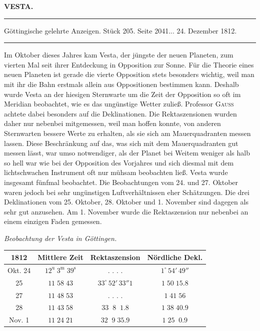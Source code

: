 \clearpage{}\hypertarget{native-366-lower}{}\label{native-366-lower}
\begin{center}\textbf{VESTA.}\par\vspace{4pt}\hrule\vspace{4pt}\fontsize{10}{12}\selectfont Göttingische gelehrte Anzeigen. Stück 205. Seite 2041\;... 24. Dezember 1812.\par\vspace{4pt}\hrule\vspace{4pt}\end{center}

\par\indent Im Oktober dieses Jahres kam Vesta, der jüngste der neuen Planeten, zum vierten Mal seit ihrer Entdeckung in Opposition zur Sonne. Für die Theorie eines neuen Planeten ist gerade die vierte Opposition stets besonders wichtig, weil man mit ihr die Bahn erstmals allein aus Oppositionen bestimmen kann. Deshalb wurde Vesta an der hiesigen Sternwarte um die Zeit der Opposition so oft im Meridian beobachtet, wie es das ungünstige Wetter zuließ. Professor \textsc{Gauss} achtete dabei besonders auf die Deklinationen. Die Rektaszensionen wurden daher nur nebenbei mitgemessen, weil man hoffen konnte, von anderen Sternwarten bessere Werte zu erhalten, als sie sich am Mauerquadranten messen lassen. Diese Beschränkung auf das, was sich mit dem Mauerquadranten gut messen lässt, war umso notwendiger, als der Planet bei Weitem weniger als halb so hell war wie bei der Opposition des Vorjahres und sich diesmal mit dem lichtschwachen Instrument oft nur mühsam beobachten ließ. Vesta wurde insgesamt fünfmal beobachtet. Die Beobachtungen vom 24. und 27. Oktober waren jedoch bei sehr ungünstigen Luftverhältnissen eher Schätzungen. Die drei Deklinationen vom 25. Oktober, 28. Oktober und 1. November sind dagegen als sehr gut anzusehen. Am 1. November wurde die Rektaszension nur nebenbei an einem einzigen Faden gemessen.

\medskip
{}\noindent\emph{Beobachtung der Vesta in Göttingen.}

\begin{center}
\fontsize{10}{12}\selectfont\setlength{\tabcolsep}{4pt}\renewcommand{\arraystretch}{1.15}\begin{tabular}{|c|c|c|c|}
\hline
1812 & Mittlere Zeit & Rektaszension & Nördliche Dekl. \\
\hline
Okt. 24 & $12^{\mathrm u}\;3^{\mathrm m}\;39^{\mathrm s}$ & . . . . & $1^\circ\,54'\,49''$ \\
25 & $11\;58\;43$ & $33^\circ\,52'\,33''1$ & $1\;50\;15.8$ \\
27 & $11\;48\;53$ & . . . . & $1\;41\;56$ \\
28 & $11\;43\;58$ & $33\;\;8\;\;1.8$ & $1\;38\;40.9$ \\
Nov. 1 & $11\;24\;21$ & $32\;\;9\;35.9$ & $1\;25\;\;0.9$ \\
\hline
\end{tabular}
\end{center}

